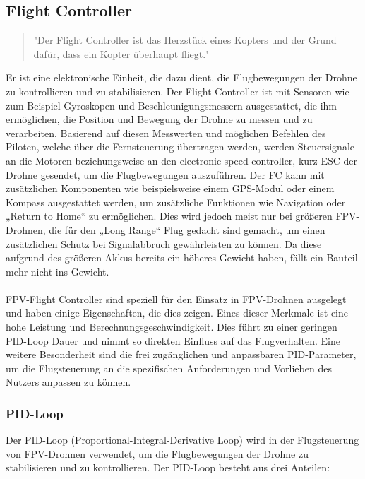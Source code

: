     \subsection[Flight Controller]{Flight Controller}
        \begin{quote}
            "Der Flight Controller ist das Herzstück eines Kopters und der Grund dafür, dass ein Kopter
            überhaupt fliegt."\cite{FCZitat}
        \end{quote}
        Er ist eine elektronische Einheit, die dazu dient, die Flugbewegungen der
        Drohne zu kontrollieren und zu stabilisieren. Der Flight Controller ist mit Sensoren wie zum
        Beispiel Gyroskopen und Beschleunigungsmessern ausgestattet, die ihm ermöglichen, die Position
        und Bewegung der Drohne zu messen und zu verarbeiten. Basierend auf diesen Messwerten und möglichen
        Befehlen des Piloten, welche über die Fernsteuerung übertragen werden, werden Steuersignale an
        die Motoren beziehungsweise an den electronic speed controller, kurz ESC der Drohne gesendet,
        um die Flugbewegungen auszuführen. Der FC kann mit zusätzlichen Komponenten wie beispielsweise
        einem GPS-Modul oder einem Kompass ausgestattet werden, um zusätzliche Funktionen wie Navigation
        oder „Return to Home“ zu ermöglichen. Dies wird jedoch meist nur bei größeren FPV-Drohnen, die
        für den „Long Range“ Flug gedacht sind gemacht, um einen zusätzlichen Schutz bei Signalabbruch
        gewährleisten zu können. Da diese aufgrund des größeren Akkus bereits ein höheres Gewicht haben,
        fällt ein Bauteil mehr nicht ins Gewicht. \\
        \\
        FPV-Flight Controller sind speziell für den Einsatz in FPV-Drohnen ausgelegt und haben einige
        Eigenschaften, die dies zeigen. Eines dieser Merkmale ist eine hohe Leistung und Berechnungsgeschwindigkeit.
        \cite{CPUDatenblatt} Dies führt zu einer geringen PID-Loop Dauer und nimmt so direkten Einfluss auf das
        Flugverhalten. Eine weitere Besonderheit sind die frei zugänglichen und anpassbaren PID-Parameter, um die
        Flugsteuerung an die spezifischen Anforderungen und Vorlieben des Nutzers anpassen zu können.
    
        \subsubsection[PID-Loop]{PID-Loop}
            Der PID-Loop (Proportional-Integral-Derivative Loop) wird in der Flugsteuerung von FPV-Drohnen verwendet, um die
            Flugbewegungen der Drohne zu stabilisieren und zu kontrollieren. Der PID-Loop besteht aus drei Anteilen:

